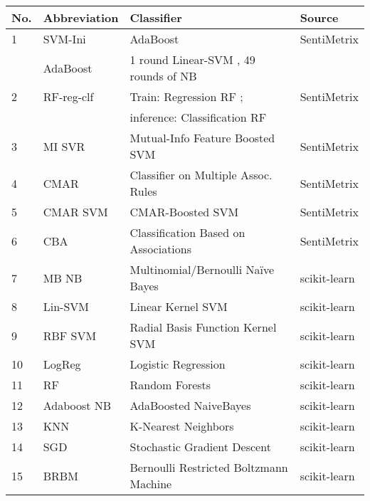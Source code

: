 \begin{table}[t]
{\small
    \centering
    \begin{tabular}{|l|l|l|l|}
    \hline
    \textsf{No.}& \textsf{Abbreviation} & \textsf{Classifier} & \textsf{Source}\\
    \hline
    1 & \textsf{SVM-Ini}& \textsf{AdaBoost \cite{adaboost} \cite{scikit-learn}} & \textsf{SentiMetrix} \\
      & \textsf{AdaBoost} & \textsf{1 round Linear-SVM \cite{cortes95}},  49 rounds of NB  & \\
    2 & \textsf{RF-reg-clf} & \textsf{Train: Regression RF \cite{ho95}}; & \textsf{SentiMetrix} \\
      & & \textsf{inference: Classification RF} & \\
    3 &\textsf{MI SVR}&  \textsf{Mutual-Info \cite{ross14} Feature Boosted SVM \cite{cortes95}} & \textsf{SentiMetrix} \\
    4 & \textsf{CMAR} &  \textsf{Classifier on Multiple Assoc. Rules \cite{cmar}}& \textsf{SentiMetrix} \\
    5 & \textsf{CMAR SVM}& \textsf{CMAR-Boosted \cite{cmar} SVM \cite{cortes95}}& \textsf{SentiMetrix} \\
    6 & \textsf{CBA} & \textsf{Classification Based on Associations \cite{cba}}& \textsf{SentiMetrix} \\
    \hline
    7 & \textsf{MB NB} & \textsf{Multinomial/Bernoulli Na\"{i}ve Bayes \cite{scikit-learn}} & \textsf{scikit-learn} \\
    8 & \textsf{Lin-SVM}& \textsf{Linear Kernel SVM \cite{cortes95}} & \textsf{scikit-learn} \\
    9 & \textsf{RBF SVM}& \textsf{Radial Basis Function Kernel SVM \cite{scikit-learn}} & \textsf{scikit-learn} \\
    10 & \textsf{LogReg} & \textsf{Logistic Regression \cite{scikit-learn}} & \textsf{scikit-learn}\\
    11 & \textsf{RF} & \textsf{Random Forests \cite{ho95}} & \textsf{scikit-learn} \\
    12 &  \textsf{Adaboost NB}& \textsf{AdaBoosted NaiveBayes \cite{adaboost}}& \textsf{scikit-learn} \\
    13 &  \textsf{KNN} & \textsf{K-Nearest Neighbors \cite{scikit-learn}} & \textsf{scikit-learn} \\
    14 & \textsf{SGD} & \textsf{Stochastic Gradient Descent \cite{scikit-learn}}& \textsf{scikit-learn} \\
    15 & \textsf{BRBM} & \textsf{Bernoulli Restricted Boltzmann Machine \cite{scikit-learn}} & \textsf{scikit-learn}\\

\end{tabular}}
\end{table}
